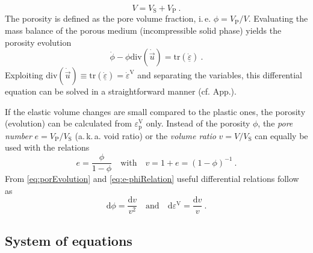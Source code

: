 \documentclass[paper=a4, twoside, pagesize]{scrartcl}
\newcommand{\tensor}[1]{\underline{#1}}
\renewcommand{\d}{\text{d}}
\newcommand{\p}{\text{p}}
\newcommand{\with}{\text{with}}
\newcommand{\trace}{\mathrm{tr}}
\newcommand{\divergence}{\mathrm{div}}
\newcommand{\inv}{{-1}}
\begin{document}
\begin{equation}
  V = V_{\text{S}} + V_{\text{P}} \ .
\end{equation}
The porosity is defined as the pore volume fraction, i.\,e. $\phi=V_{\text{P}}/V$. Evaluating the mass balance of the porous medium (incompressible solid phase) yields the porosity evolution 
\begin{equation}\label{eq:porEvolution}
  \dot{\phi} - \phi\divergence(\dot{\vec u}) = \trace(\dot{\tensor\varepsilon})\ .
\end{equation}
Exploiting $\divergence(\dot{\vec u})\equiv \trace(\dot{\tensor\varepsilon})=\dot{\varepsilon}^\text{V}$ and separating the variables, this differential equation can be solved in a straightforward manner (cf. App.).

If the elastic volume changes are small compared to the plastic ones, the porosity (evolution) can be calculated from $\varepsilon^\text{V}_\p$ only. Instead of the porosity $\phi$, the \emph{pore number} $e=V_{\text{P}} / V_{\text{S}}$ (a.\,k.\,a. void ratio) or the \emph{volume ratio} $v=V / V_{\text{S}}$ can equally be used with the relations
\begin{equation}\label{eq:e-phiRelation}
  e = \frac{\phi}{1-\phi} \quad\with\quad v = 1+e = (1-\phi)^\inv \ .
\end{equation}
From \eqref{eq:porEvolution} and \eqref{eq:e-phiRelation} useful differential relations follow as
\begin{equation}\label{eq:diffRelations}
  \d\phi = \frac{\d v}{v^2} \quad\text{and}\quad \d\varepsilon^\text{V} = \frac{\d v}{v} \ .
\end{equation}

\subsection{System of equations}
\end{document}
